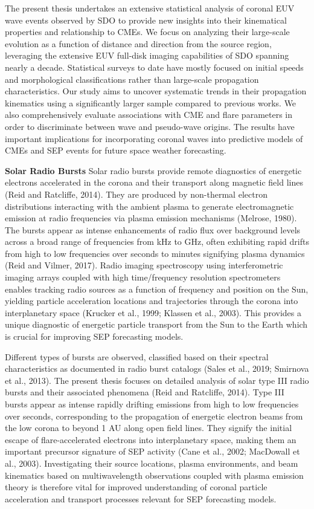 The present thesis undertakes an extensive statistical analysis of coronal EUV wave events observed by SDO to provide new insights into their kinematical properties and relationship to CMEs. We focus on analyzing their large-scale evolution as a function of distance and direction from the source region, leveraging the extensive EUV full-disk imaging capabilities of SDO spanning nearly a decade. Statistical surveys to date have mostly focused on initial speeds and morphological classifications rather than large-scale propagation characteristics. Our study aims to uncover systematic trends in their propagation kinematics using a significantly larger sample compared to previous works. We also comprehensively evaluate associations with CME and flare parameters in order to discriminate between wave and pseudo-wave origins. The results have important implications for incorporating coronal waves into predictive models of CMEs and SEP events for future space weather forecasting.

\textbf{Solar Radio Bursts}
Solar radio bursts provide remote diagnostics of energetic electrons accelerated in the corona and their transport along magnetic field lines (Reid and Ratcliffe, 2014). They are produced by non-thermal electron distributions interacting with the ambient plasma to generate electromagnetic emission at radio frequencies via plasma emission mechanisms (Melrose, 1980). The bursts appear as intense enhancements of radio flux over background levels across a broad range of frequencies from kHz to GHz, often exhibiting rapid drifts from high to low frequencies over seconds to minutes signifying plasma dynamics (Reid and Vilmer, 2017). Radio imaging spectroscopy using interferometric imaging arrays coupled with high time/frequency resolution spectrometers enables tracking radio sources as a function of frequency and position on the Sun, yielding particle acceleration locations and trajectories through the corona into interplanetary space (Krucker et al., 1999; Klassen et al., 2003). This provides a unique diagnostic of energetic particle transport from the Sun to the Earth which is crucial for improving SEP forecasting models.

Different types of bursts are observed, classified based on their spectral characteristics as documented in radio burst catalogs (Sales et al., 2019; Smirnova et al., 2013). The present thesis focuses on detailed analysis of solar type III radio bursts and their associated phenomena (Reid and Ratcliffe, 2014). Type III bursts appear as intense rapidly drifting emissions from high to low frequencies over seconds, corresponding to the propagation of energetic electron beams from the low corona to beyond 1 AU along open field lines. They signify the initial escape of flare-accelerated electrons into interplanetary space, making them an important precursor signature of SEP activity (Cane et al., 2002; MacDowall et al., 2003). Investigating their source locations, plasma environments, and beam kinematics based on multiwavelength observations coupled with plasma emission theory is therefore vital for improved understanding of coronal particle acceleration and transport processes relevant for SEP forecasting models.

